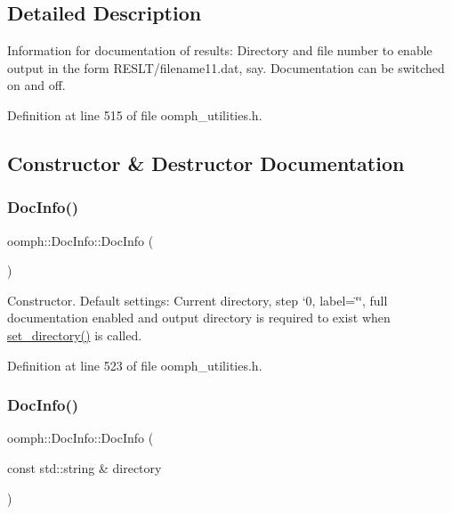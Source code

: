 \subsection{Detailed Description}
Information for documentation of results\+: Directory and file number to enable output in the form R\+E\+S\+L\+T/filename11.\+dat, say. Documentation can be switched on and off. 

Definition at line 515 of file oomph\+\_\+utilities.\+h.



\subsection{Constructor \& Destructor Documentation}
\mbox{\label{classoomph_1_1DocInfo_ad6e3252144b9a6e1a1b93a6b8ea51111}} 
\subsubsection{\texorpdfstring{Doc\+Info()}{DocInfo()}\hspace{0.1cm}{\footnotesize\ttfamily [1/2]}}
{\footnotesize\ttfamily oomph\+::\+Doc\+Info\+::\+Doc\+Info (\begin{DoxyParamCaption}{ }\end{DoxyParamCaption})\hspace{0.3cm}{\ttfamily [inline]}}



Constructor. Default settings\+: Current directory, step `0\textquotesingle{}, label=\char`\"{}\char`\"{}, full documentation enabled and output directory is required to exist when \hyperlink{classoomph_1_1DocInfo_a9800cf1d178162d521588e6e336a6e65}{set\+\_\+directory()} is called. 



Definition at line 523 of file oomph\+\_\+utilities.\+h.

\mbox{\label{classoomph_1_1DocInfo_ac3cf3fea5013b3505b59b9f3e15872f1}} 
\subsubsection{\texorpdfstring{Doc\+Info()}{DocInfo()}\hspace{0.1cm}{\footnotesize\ttfamily [2/2]}}
{\footnotesize\ttfamily oomph\+::\+Doc\+Info\+::\+Doc\+Info (\begin{DoxyParamCaption}\item[{const std\+::string \&}]{directory }\end{DoxyParamCaption})\hspace{0.3cm}{\ttfamily [inline]}}



